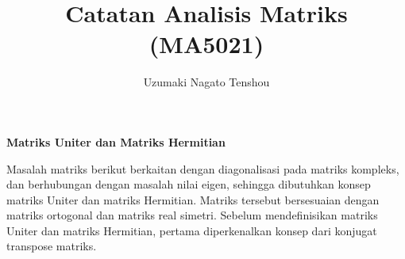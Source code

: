 \documentclass[11pt,a4paper]{article}
\author{Uzumaki Nagato Tenshou}
\title{Catatan Analisis Matriks (MA5021)}
\theoremstyle{plain}
\theoremstyle{definition}
\theoremstyle{remark}
\begin{document}
\maketitle
\pagestyle{fancy}


\begin{center}
	\textbf{Matriks Uniter dan Matriks Hermitian}
\end{center}



Masalah matriks berikut berkaitan dengan diagonalisasi pada matriks kompleks, dan berhubungan dengan masalah nilai eigen, sehingga dibutuhkan konsep matriks Uniter dan matriks Hermitian. Matriks tersebut bersesuaian dengan matriks ortogonal dan matriks real simetri. Sebelum mendefinisikan matriks Uniter dan matriks Hermitian, pertama diperkenalkan konsep dari konjugat transpose matriks.
\end{document}
